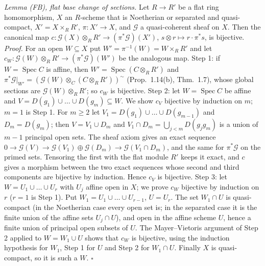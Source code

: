 \documentclass[11pt]{article}
\begin{document}
\emph{Lemma (FB), flat base change of sections.} Let $R\to R'$ be a flat ring homomorphism, $X$ an $R$-scheme that is Noetherian or separated and quasi-compact, $X'=X\times_RR'$, $\pi:X'\to X$, and $\mathcal{G}$ a quasi-coherent sheaf on $X$. Then the canonical map $c:\mathcal{G}(X)\otimes_RR'\to(\pi^*\mathcal{G})(X')$, $s\otimes r\mapsto r\cdot\pi^*s$, is bijective.
\emph{Proof.} For an open $W\subseteq X$ put $W'=\pi^{-1}(W)=W\times_RR'$ and let $c_W:\mathcal{G}(W)\otimes_RR'\to(\pi^*\mathcal{G})(W')$ be the analogous map. Step 1: if $W=\operatorname{Spec}C$ is affine, then $W'=\operatorname{Spec}(C\otimes_RR')$ and $\pi^*\mathcal{G}|_{W'}=(\mathcal{G}(W)\otimes_C(C\otimes_RR'))^\sim$ (Prop.~1.14(b), Thm.~1.7), whose global sections are $\mathcal{G}(W)\otimes_RR'$; so $c_W$ is bijective. Step 2: let $W=\operatorname{Spec}C$ be affine and $V=D(g_1)\cup\dots\cup D(g_m)\subseteq W$. We show $c_V$ bijective by induction on $m$; $m=1$ is Step 1. For $m\ge2$ let $V_1=D(g_1)\cup\dots\cup D(g_{m-1})$ and $D_m=D(g_m)$; then $V=V_1\cup D_m$ and $V_1\cap D_m=\bigcup_{j<m}D(g_jg_m)$ is a union of $m-1$ principal open sets. The sheaf axiom gives an exact sequence $0\to\mathcal{G}(V)\to\mathcal{G}(V_1)\oplus\mathcal{G}(D_m)\to\mathcal{G}(V_1\cap D_m)$, and the same for $\pi^*\mathcal{G}$ on the primed sets. Tensoring the first with the flat module $R'$ keeps it exact, and $c$ gives a morphism between the two exact sequences whose second and third components are bijective by induction. Hence $c_V$ is bijective. Step 3: let $W=U_1\cup\dots\cup U_r$ with $U_j$ affine open in $X$; we prove $c_W$ bijective by induction on $r$ ($r=1$ is Step 1). Put $W_1=U_1\cup\dots\cup U_{r-1}$, $U=U_r$. The set $W_1\cap U$ is quasi-compact (in the Noetherian case every open set is; in the separated case it is the finite union of the affine sets $U_j\cap U$), and open in the affine scheme $U$, hence a finite union of principal open subsets of $U$. The Mayer--Vietoris argument of Step 2 applied to $W=W_1\cup U$ shows that $c_W$ is bijective, using the induction hypothesis for $W_1$, Step 1 for $U$ and Step 2 for $W_1\cap U$. Finally $X$ is quasi-compact, so it is such a $W$. $\square$
\end{document}
